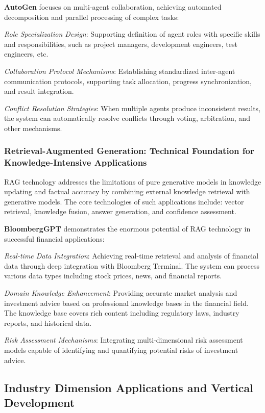 \documentclass{article}
\begin{document}
\textbf{AutoGen} focuses on multi-agent collaboration, achieving automated decomposition and parallel processing of complex tasks:

\textit{Role Specialization Design}: Supporting definition of agent roles with specific skills and responsibilities, such as project managers, development engineers, test engineers, etc.

\textit{Collaboration Protocol Mechanisms}: Establishing standardized inter-agent communication protocols, supporting task allocation, progress synchronization, and result integration.

\textit{Conflict Resolution Strategies}: When multiple agents produce inconsistent results, the system can automatically resolve conflicts through voting, arbitration, and other mechanisms.

\subsubsection{Retrieval-Augmented Generation: Technical Foundation for Knowledge-Intensive Applications}
RAG technology addresses the limitations of pure generative models in knowledge updating and factual accuracy by combining external knowledge retrieval with generative models. The core technologies of such applications include: vector retrieval, knowledge fusion, answer generation, and confidence assessment.

\textbf{BloombergGPT} demonstrates the enormous potential of RAG technology in successful financial applications:

\textit{Real-time Data Integration}: Achieving real-time retrieval and analysis of financial data through deep integration with Bloomberg Terminal. The system can process various data types including stock prices, news, and financial reports.

\textit{Domain Knowledge Enhancement}: Providing accurate market analysis and investment advice based on professional knowledge bases in the financial field. The knowledge base covers rich content including regulatory laws, industry reports, and historical data.

\textit{Risk Assessment Mechanisms}: Integrating multi-dimensional risk assessment models capable of identifying and quantifying potential risks of investment advice.

\subsection{Industry Dimension Applications and Vertical Development}
\end{document}
